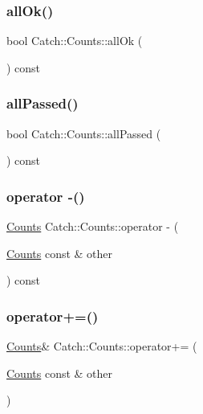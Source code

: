 \subsubsection{\texorpdfstring{allOk()}{allOk()}}
{\footnotesize\ttfamily bool Catch\+::\+Counts\+::all\+Ok (\begin{DoxyParamCaption}{ }\end{DoxyParamCaption}) const}

\mbox{\label{struct_catch_1_1_counts_a84999490e0ecaa3de5e121bf48eda1b3}} 
\subsubsection{\texorpdfstring{allPassed()}{allPassed()}}
{\footnotesize\ttfamily bool Catch\+::\+Counts\+::all\+Passed (\begin{DoxyParamCaption}{ }\end{DoxyParamCaption}) const}

\mbox{\label{struct_catch_1_1_counts_a954a6bf7a975467774c5f2795bbda0ac}} 
\subsubsection{\texorpdfstring{operator -\/()}{operator -()}}
{\footnotesize\ttfamily \mbox{\hyperlink{struct_catch_1_1_counts}{Counts}} Catch\+::\+Counts\+::operator -\/ (\begin{DoxyParamCaption}\item[{\mbox{\hyperlink{struct_catch_1_1_counts}{Counts}} const \&}]{other }\end{DoxyParamCaption}) const}

\mbox{\label{struct_catch_1_1_counts_a322a89475cd2cc039140ef371e973677}} 
\subsubsection{\texorpdfstring{operator+=()}{operator+=()}}
{\footnotesize\ttfamily \mbox{\hyperlink{struct_catch_1_1_counts}{Counts}}\& Catch\+::\+Counts\+::operator+= (\begin{DoxyParamCaption}\item[{\mbox{\hyperlink{struct_catch_1_1_counts}{Counts}} const \&}]{other }\end{DoxyParamCaption})}

